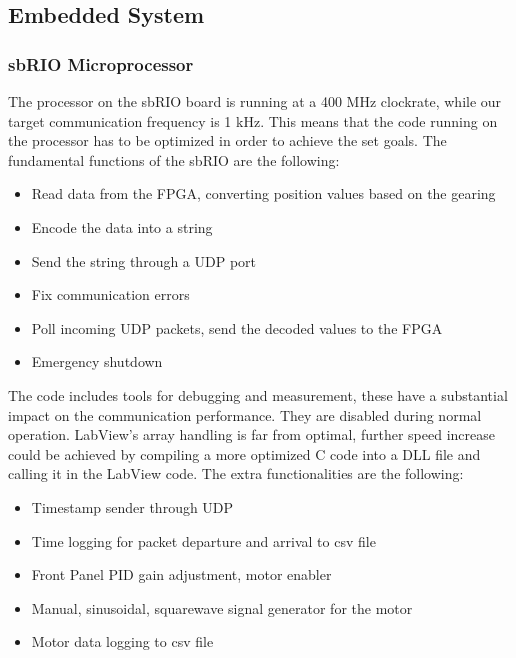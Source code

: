 \subsection{Embedded System}

\subsubsection{sbRIO Microprocessor}

The processor on the sbRIO board is running at a 400 MHz clockrate, while our target communication frequency is 1 kHz. This means that the code running on the processor has to be optimized in order to achieve the set goals. The fundamental functions of the sbRIO are the following:

\begin{itemize}
	\setlength\itemsep{0em}
	\item Read data from the FPGA, converting position values based on the gearing
	\item Encode the data into a string
	\item Send the string through a UDP port
	\item Fix communication errors
	\item Poll incoming UDP packets, send the decoded values to the FPGA
	\item Emergency shutdown	
\end{itemize}


The code includes tools for debugging and measurement, these have a substantial impact on the communication performance. They are disabled during normal operation. LabView's array handling is far from optimal, further speed increase could be achieved by compiling a more optimized C code into a DLL file and calling it in the LabView code. The extra functionalities are the following:

\begin{itemize}	
	\setlength\itemsep{0em}
	\item Timestamp sender through UDP
	\item Time logging for packet departure and arrival to csv file
	\item Front Panel PID gain adjustment, motor enabler
	\item Manual, sinusoidal, squarewave signal generator for the motor
	\item Motor data logging to csv file
	
\end{itemize}

